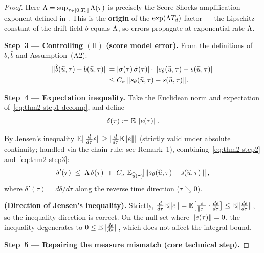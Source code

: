 \begin{proof}
Here $\Lambda = \sup_{\tau \in [0, T_{d}]} \Lambda(\tau)$ is precisely the Score Shocks amplification exponent defined in \citet{sarkar2026scoreshocks}. This is the \textbf{origin} of the $\exp(\Lambda T_{d})$ factor --- the Lipschitz constant of the drift field $b$ equals $\Lambda$, so errors propagate at exponential rate $\Lambda$.

\medskip
\noindent
\textbf{Step~3 --- Controlling $(\mathrm{II})$ (score model error).}
From the definitions of $b, \hat b$ and Assumption~(A2):
\begin{align}
\lVert \hat b(\widehat{u}, \tau) - b(\widehat{u}, \tau) \rVert
&= \lvert \sigma(\tau)\,\dot\sigma(\tau) \rvert \cdot \lVert s_{\theta}(\widehat{u}, \tau) - s(\widehat{u}, \tau) \rVert \notag \\
&\le C_{\sigma}\,\lVert s_{\theta}(\widehat{u}, \tau) - s(\widehat{u}, \tau) \rVert.
\label{eq:thm2-step3}
\end{align}

\medskip
\noindent
\textbf{Step~4 --- Expectation inequality.}
Take the Euclidean norm and expectation of~\eqref{eq:thm2-step1-decomp}, and define
\begin{equation}
\delta(\tau) \coloneqq \mathbb{E}\,\lVert e(\tau) \rVert.
\label{eq:thm2-step4-delta}
\end{equation}

By Jensen's inequality $\mathbb{E}\lVert \frac{d}{d\tau}e \rVert \ge \lvert \frac{d}{d\tau}\mathbb{E}\lVert e \rVert \rvert$ (strictly valid under absolute continuity; handled via the chain rule; see Remark~1), combining~\eqref{eq:thm2-step2} and~\eqref{eq:thm2-step3}:
\begin{equation}
\delta'(\tau)
\;\le\; \Lambda\,\delta(\tau)
\;+\; C_{\sigma}\;\mathbb{E}_{\widehat{u}(\tau)}\!\bigl[\lVert s_{\theta}(\widehat{u}, \tau) - s(\widehat{u}, \tau) \rVert\bigr],
\label{eq:thm2-step4-ineq}
\end{equation}
where $\delta'(\tau) = d\delta/d\tau$ along the reverse time direction ($\tau \searrow 0$).

\begin{remark}
\textbf{(Direction of Jensen's inequality).} Strictly, $\frac{d}{d\tau}\mathbb{E}\lVert e \rVert = \mathbb{E}\bigl[\frac{e}{\lVert e \rVert} \cdot \frac{d e}{d\tau}\bigr] \le \mathbb{E}\lVert \frac{d e}{d\tau} \rVert$, so the inequality direction is correct. On the null set where $\lVert e(\tau) \rVert = 0$, the inequality degenerates to $0 \le \mathbb{E}\lVert \frac{d e}{d\tau} \rVert$, which does not affect the integral bound.
\end{remark}

\medskip
\noindent
\textbf{Step~5 --- Repairing the measure mismatch (core technical step).}


\end{proof}
